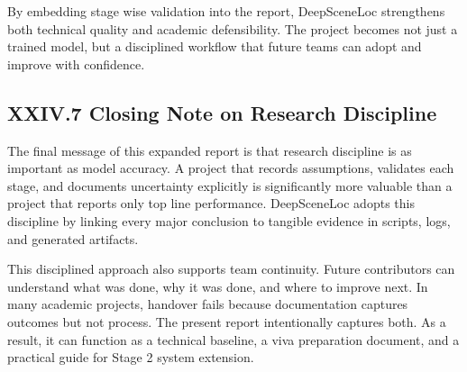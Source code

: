 By embedding stage wise validation into the report, DeepSceneLoc strengthens both technical quality and academic defensibility. The project becomes not just a trained model, but a disciplined workflow that future teams can adopt and improve with confidence.

\subsection*{XXIV.7 Closing Note on Research Discipline}
The final message of this expanded report is that research discipline is as important as model accuracy. A project that records assumptions, validates each stage, and documents uncertainty explicitly is significantly more valuable than a project that reports only top line performance. DeepSceneLoc adopts this discipline by linking every major conclusion to tangible evidence in scripts, logs, and generated artifacts.

This disciplined approach also supports team continuity. Future contributors can understand what was done, why it was done, and where to improve next. In many academic projects, handover fails because documentation captures outcomes but not process. The present report intentionally captures both. As a result, it can function as a technical baseline, a viva preparation document, and a practical guide for Stage 2 system extension.


